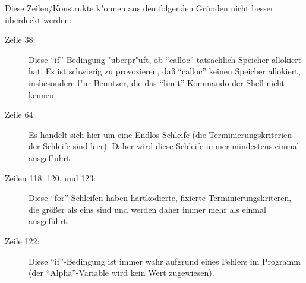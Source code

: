 \noindent
Diese Zeilen/Konstrukte k"onnen aus den folgenden Gr\"unden nicht
besser \"uberdeckt werden:

\begin{description}
\item[Zeile 38:] Diese ``if''-Bedingung "uberpr"uft, ob ``calloc''
tats\"achlich Speicher allokiert hat.  Es ist schwierig zu
provozieren, da{\ss} ``calloc'' keinen Speicher allokiert, insbesondere
f"ur Benutzer, die das ``limit''-Kommando der Shell nicht kennen.

\item[Zeile 64:] Es handelt sich hier um eine Endlos-Schleife (die
Terminierungskriterien der Schleife sind leer).  Daher wird diese
Schleife immer mindestens einmal ausgef"uhrt.

\item[Zeilen 118, 120, und 123:]  Diese ``for''-Schleifen haben
hartkodierte, fixierte Terminierungskriteren, die gr\"o{\ss}er als
eins sind und werden daher immer mehr als einmal ausgef\"uhrt.

\item[Zeile 122:] Diese ``if''-Bedingung ist immer wahr aufgrund eines
Fehlers im Programm (der ``Alpha''-Variable wird kein Wert zugewiesen).

\end{description}

